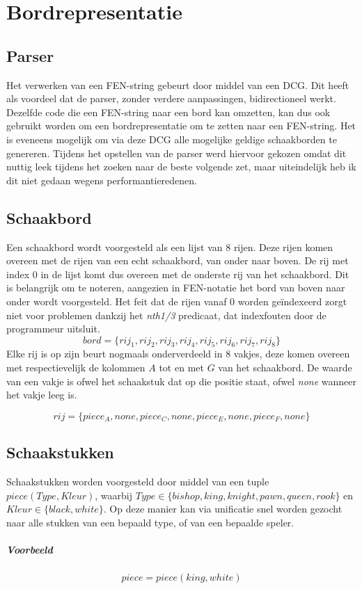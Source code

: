 \chapter{Bordrepresentatie}

\section{Parser}
Het verwerken van een FEN-string gebeurt door middel van een DCG. Dit heeft als voordeel dat de parser, zonder verdere aanpassingen, bidirectioneel werkt. Dezelfde code die een FEN-string naar een bord kan omzetten, kan dus ook gebruikt worden om een bordrepresentatie om te zetten naar een FEN-string. Het is eveneens mogelijk om via deze DCG alle mogelijke geldige schaakborden te genereren. Tijdens het opstellen van de parser werd hiervoor gekozen omdat dit nuttig leek tijdens het zoeken naar de beste volgende zet, maar uiteindelijk heb ik dit niet gedaan wegens performantieredenen.

\section{Schaakbord}
Een schaakbord wordt voorgesteld als een lijst van 8 rijen. Deze rijen komen overeen met de rijen van een echt schaakbord, van onder naar boven. De rij met index 0 in de lijst komt dus overeen met de onderste rij van het schaakbord. Dit is belangrijk om te noteren, aangezien in FEN-notatie het bord van boven naar onder wordt voorgesteld. Het feit dat de rijen vanaf 0 worden ge\"indexeerd zorgt niet voor problemen dankzij het \emph{nth1/3} predicaat, dat indexfouten door de programmeur uitsluit.
$$bord = \{rij_1, rij_2, rij_3, rij_4, rij_5, rij_6, rij_7, rij_8\}$$
Elke rij is op zijn beurt nogmaals onderverdeeld in 8 vakjes, deze komen overeen met respectievelijk de kolommen $A$ tot en met $G$ van het schaakbord. De waarde van een vakje is ofwel het schaakstuk dat op die positie staat, ofwel \emph{none} wanneer het vakje leeg is.

$$rij = \{piece_A, none, piece_C, none, piece_E, none, piece_F, none\}$$

\section{Schaakstukken}
Schaakstukken worden voorgesteld door middel van een tuple $piece(Type, Kleur)$, waarbij $Type \in \{bishop, king, knight, pawn, queen, rook\}$ en $Kleur \in \{black, white\}$. Op deze manier kan via unificatie snel worden gezocht naar alle stukken van een bepaald type, of van een bepaalde speler.
\paragraph*{Voorbeeld} 
$$piece = piece(king, white)$$